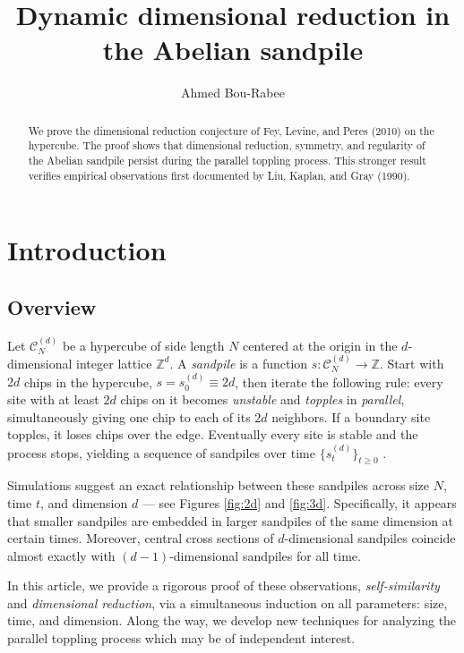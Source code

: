 \documentclass[12pt]{amsart}
\title{Dynamic dimensional reduction in the Abelian sandpile}
\author{Ahmed Bou-Rabee}
\newcommand{\Z}{\mathbb{Z}}
\begin{document}
	
	\begin{abstract}
		We prove the dimensional reduction conjecture of Fey, Levine, and Peres (2010) on the hypercube. 
		The proof shows that dimensional reduction, symmetry, and regularity of the Abelian sandpile persist during the parallel toppling process. This stronger result verifies empirical observations first documented by Liu, Kaplan, and Gray (1990).  %
	\end{abstract}
	\maketitle
	
	\section{Introduction}
	
	\subsection{Overview} 
	Let $\mathcal{C}_N^{(d)}$ be a hypercube of side length $N$ centered at the origin in the $d$-dimensional integer lattice $\Z^d$.  A {\it sandpile} is a function $s: \mathcal{C}_N^{(d)} \to \Z$. Start with $2d$ chips in the hypercube,  $s = s_0^{(d)} \equiv 2d$, then iterate the following rule: every site with at least $2d$ chips on it becomes {\it unstable} 
	and {\it topples} in {\it parallel}, simultaneously giving one chip to each of its $2d$ neighbors. If a boundary site topples, it loses chips over the edge. Eventually every site is stable and the process stops, yielding a sequence of sandpiles over time $\{s_t^{(d)}\}_{t \geq 0}$ \cite{bak1987self, dhar1990self, holroyd2008chip,levine2010sandpile,levine2017laplacian,jarai2018sandpile, klivans2018mathematics}.
	
	Simulations suggest an exact relationship between these sandpiles across size $N$, time $t$, and dimension $d$ --- see Figures \ref{fig:2d} and \ref{fig:3d}. 
	Specifically, it appears that smaller sandpiles are embedded in larger sandpiles of the same dimension at certain times. Moreover, 
	central cross sections of $d$-dimensional sandpiles coincide almost exactly with $(d-1)$-dimensional sandpiles for all time.  
	
	In this article, we provide a rigorous proof of these observations, {\it self-similarity} and {\it dimensional reduction}, 
	via a simultaneous induction on all parameters: size, time, and dimension. Along the way, we develop new techniques for analyzing the parallel toppling process which may be of independent interest.  %
\end{document}

